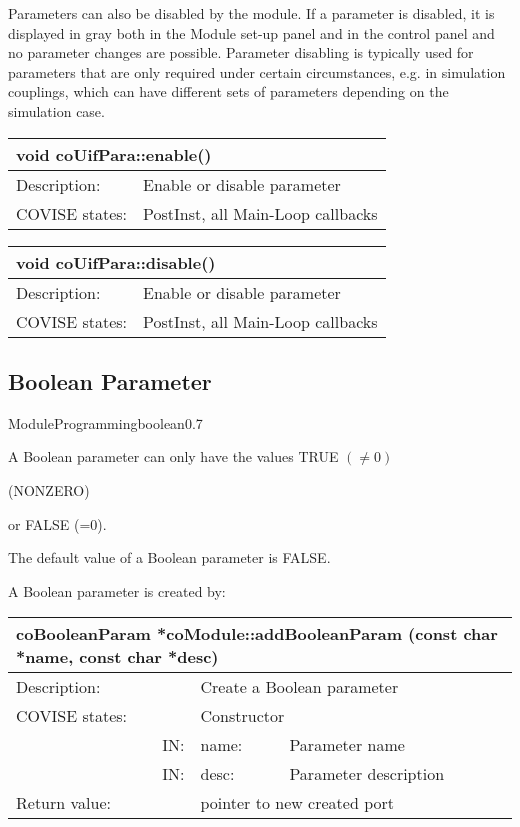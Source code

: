 Parameters can also be disabled by the module. If a parameter is disabled, it is 
displayed in gray both in the Module set-up panel and in the control panel and no 
parameter changes are possible. Parameter disabling is typically used for parameters 
that are only required under certain circumstances, e.g. in simulation couplings, 
which can have different sets of parameters depending on the simulation case.


\begin{longtable}{|p{4cm}|p{10cm}|}
\hline
\multicolumn{2}{|p{13.5cm}|}{\bf void coUifPara::enable()} \\
\hline
{Description:}   & 
           {Enable or disable parameter} \\
\hline
{COVISE states:} 
            & {PostInst, all Main-Loop callbacks} \endhead
\hline	   
\end{longtable}

\begin{longtable}{|p{4cm}|p{10cm}|}
\hline
\multicolumn{2}{|p{13.5cm}|}{\bf void coUifPara::disable()} \\
\hline
{Description:}   & 
           {Enable or disable parameter} \\
\hline
{COVISE states:} 
            & {PostInst, all Main-Loop callbacks} \endhead
\hline	   
\end{longtable}

\subsection{Boolean Parameter}

\begin{covimgpath}{ModuleProgramming}{boolean}{0.7} \end{covimgpath}

A Boolean parameter can only have the values TRUE \latexonly $(\neq0)$ \endlatexonly 
\begin{htmlonly} (NONZERO) \end{htmlonly} or FALSE (=0).

The default value of a Boolean parameter is FALSE.

A Boolean parameter is created by:

	 
\begin{longtable}{|p{4cm}|p{2.5cm}|p{7cm}|}
\hline
\multicolumn{3}{|p{13.5cm}|}{\bf coBooleanParam *coModule::addBooleanParam 
(const char *name, const char *desc)} \\
\hline
{Description:}   
                        & \multicolumn{2}{|p{9.5cm}|}{Create a Boolean parameter} \\
\hline
{COVISE states:} & \multicolumn{2}{|p{9.5cm}|}{Constructor} \\
\hline
\multicolumn{1}{|r|}{IN:} & {name:} 
                             & {Parameter name}\\
\hline
\multicolumn{1}{|r|}{IN:} & {desc:} 
                            & {Parameter description}\\
\hline
{Return value:}  
                        & \multicolumn{2}{|p{9.5cm}|}{pointer to new created port} \endhead
\hline
\end{longtable}
		   
